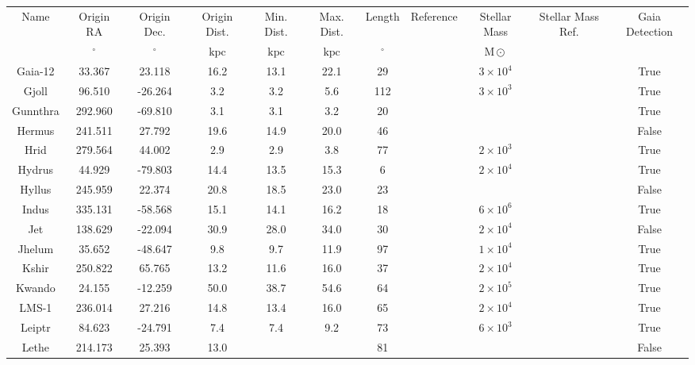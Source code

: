 \begin{table}
\begin{tabular}{ccccccccccc}
\hline \hline
Name & Origin RA & Origin Dec. & Origin Dist. & Min. Dist. & Max. Dist. & Length & Reference & Stellar Mass & Stellar Mass Ref. & Gaia Detection \\
 & $\mathrm{{}^{\circ}}$ & $\mathrm{{}^{\circ}}$ & $\mathrm{kpc}$ & $\mathrm{kpc}$ & $\mathrm{kpc}$ & $\mathrm{{}^{\circ}}$ &  & $\mathrm{M{\odot}}$ &  &  \\
\hline
Gaia-12 & 33.367 & 23.118 & 16.2 & 13.1 & 22.1 & 29 & \citet{ibata:2023} & $3 \times 10^{4}$ &  & True \\
Gjoll & 96.510 & -26.264 & 3.2 & 3.2 & 5.6 & 112 & \citet{ibata:2023} & $3 \times 10^{3}$ &  & True \\
Gunnthra & 292.960 & -69.810 & 3.1 & 3.1 & 3.2 & 20 & \citet{ibata:2021} & &  & True \\
Hermus & 241.511 & 27.792 & 19.6 & 14.9 & 20.0 & 46 & \citet{grillmair:2014} & &  & False \\
Hrid & 279.564 & 44.002 & 2.9 & 2.9 & 3.8 & 77 & \citet{ibata:2023} & $2 \times 10^{3}$ &  & True \\
Hydrus & 44.929 & -79.803 & 14.4 & 13.5 & 15.3 & 6 & \citet{ibata:2023} & $2 \times 10^{4}$ &  & True \\
Hyllus & 245.959 & 22.374 & 20.8 & 18.5 & 23.0 & 23 & \citet{grillmair:2014} & &  & False \\
Indus & 335.131 & -58.568 & 15.1 & 14.1 & 16.2 & 18 & \citet{shipp:2019} & $6 \times 10^{6}$ & \citet{shipp:2018} & True \\
Jet & 138.629 & -22.094 & 30.9 & 28.0 & 34.0 & 30 & \citet{ferguson:2022} & $2 \times 10^{4}$ & \citet{jethwa:2018} & False \\
Jhelum & 35.652 & -48.647 & 9.8 & 9.7 & 11.9 & 97 & \citet{ibata:2023} & $1 \times 10^{4}$ &  & True \\
Kshir & 250.822 & 65.765 & 13.2 & 11.6 & 16.0 & 37 & \citet{ibata:2023} & $2 \times 10^{4}$ &  & True \\
Kwando & 24.155 & -12.259 & 50.0 & 38.7 & 54.6 & 64 & \citet{ibata:2023} & $2 \times 10^{5}$ &  & True \\
LMS-1 & 236.014 & 27.216 & 14.8 & 13.4 & 16.0 & 65 & \citet{ibata:2023} & $2 \times 10^{4}$ &  & True \\
Leiptr & 84.623 & -24.791 & 7.4 & 7.4 & 9.2 & 73 & \citet{ibata:2023} & $6 \times 10^{3}$ &  & True \\
Lethe & 214.173 & 25.393 & 13.0 & & & 81 & \citet{grillmair:2009} & &  & False \\

\end{tabular}
\end{table}
